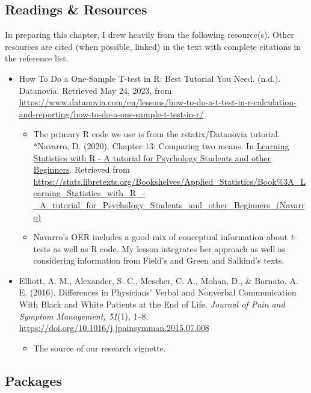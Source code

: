 \documentclass[
  11pt,
]{book}
\providecommand{\tightlist}{%
  \setlength{\itemsep}{0pt}\setlength{\parskip}{0pt}}
\begin{document}
\hypertarget{readings-resources-1}{%
\subsection{Readings \& Resources}\label{readings-resources-1}}

In preparing this chapter, I drew heavily from the following resource(s). Other resources are cited (when possible, linked) in the text with complete citations in the reference list.

\begin{itemize}
\tightlist
\item
  How To Do a One-Sample T-test in R: Best Tutorial You Need. (n.d.). Datanovia. Retrieved May 24, 2023, from \url{https://www.datanovia.com/en/lessons/how-to-do-a-t-test-in-r-calculation-and-reporting/how-to-do-a-one-sample-t-test-in-r/}

  \begin{itemize}
  \tightlist
  \item
    The primary R code we use is from the rstatix/Datanovia tutorial. *Navarro, D. (2020). Chapter 13: Comparing two means. In \href{https://learningstatisticswithr.com/}{Learning Statistics with R - A tutorial for Psychology Students and other Beginners}. Retrieved from \url{https://stats.libretexts.org/Bookshelves/Applied_Statistics/Book\%3A_Learning_Statistics_with_R_-_A_tutorial_for_Psychology_Students_and_other_Beginners_(Navarro)}
  \item
    Navarro's OER includes a good mix of conceptual information about \emph{t}-tests as well as R code. My lesson integrates her approach as well as considering information from Field's \citeyearpar{field_discovering_2012} and Green and Salkind's \citeyearpar{green_using_2017} texts.
  \end{itemize}
\item
  Elliott, A. M., Alexander, S. C., Mescher, C. A., Mohan, D., \& Barnato, A. E. (2016). Differences in Physicians' Verbal and Nonverbal Communication With Black and White Patients at the End of Life. \emph{Journal of Pain and Symptom Management, 51}(1), 1--8. \url{https://doi.org/10.1016/j.jpainsymman.2015.07.008}

  \begin{itemize}
  \tightlist
  \item
    The source of our research vignette.
  \end{itemize}
\end{itemize}

\hypertarget{packages}{%
\subsection{Packages}\label{packages}}
\end{document}
